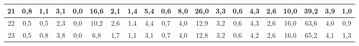 \begin{sidewaystable}[]
\begin{tabular}{|c|c|c|c|c|c|c|c|c|c|c|c|c|c|c|c|c|c|c|c|}
    21 & 0,8                                             & 1,1                                             & 3,1                                             & 0,0                                             & 16,6                                             & 2,1                                              & 1,4                                              & 5,4                                              & 0,6                                              & 8,0                                              & 26,0                                             & 3,3                                              & 0,6                                              & 4,3                                              & 2,6                                              & 10,0                                             & 39,2                                             & 3,9                                              & 1,0                                              \\ \hline
    22 & 0,5                                             & 0,5                                             & 2,3                                             & 0,0                                             & 10,2                                             & 2,6                                              & 1,4                                              & 4,4                                              & 0,7                                              & 4,0                                              & 12,9                                             & 3,2                                              & 0,6                                              & 4,3                                              & 2,6                                              & 16,0                                             & 63,6                                             & 4,0                                              & 0,9                                              \\ \hline
    23 & 0,5                                             & 0,8                                             & 3,8                                             & 0,0                                             & 6,8                                              & 1,7                                              & 1,1                                              & 3,1                                              & 0,7                                              & 4,0                                              & 12,8                                             & 3,2                                              & 0,6                                              & 4,2                                              & 2,6                                              & 16,0                                             & 65,2                                             & 4,1                                              & 1,3                                              \\ \hline

\end{tabular}
\end{sidewaystable}
